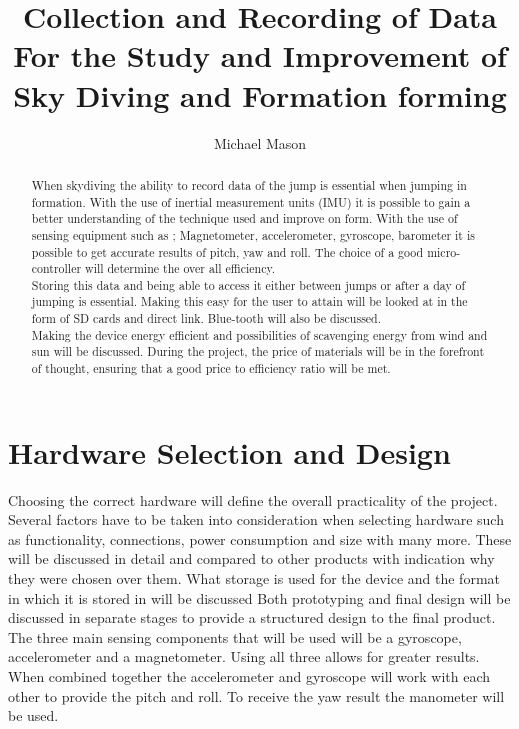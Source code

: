 \documentclass{report}
\begin{document}
\title{Collection and Recording of Data For the Study and Improvement of Sky Diving and Formation forming}
\author{Michael Mason}

\maketitle


\begin{abstract}
When skydiving the ability to record data of the jump is essential when jumping in formation. With the use of inertial measurement units (IMU) it is possible to gain a better understanding of the technique used and improve on form. With the use of sensing equipment such as ; Magnetometer, accelerometer, gyroscope, barometer it is possible to get accurate results of pitch, yaw and roll. The choice of a good micro-controller will determine the over all efficiency.\\
Storing this data and being able to access it either between jumps or after a day of jumping is essential. Making this easy for the user to attain will be looked at in the form of SD cards and direct link. Blue-tooth will also be discussed.\\
Making the device energy efficient and possibilities of scavenging energy from wind and sun will be discussed. During the project, the price of materials will be in the forefront of thought, ensuring that a good price to efficiency ratio will be met.

\end{abstract}

\tableofcontents



\chapter{Hardware Selection and Design}
Choosing the correct hardware will define the overall practicality of the project. Several factors have to be taken into consideration when selecting hardware such as functionality, connections, power consumption and size with many more. These will be discussed in detail and compared to other products with indication why they were chosen over them. What storage is used for the device and the format in which it is stored in will be discussed
Both prototyping and final design will be discussed in separate stages to provide a structured design to the final product.
The three main sensing components that will be used will be a gyroscope, accelerometer and a magnetometer. Using all three allows for greater results. When combined together the accelerometer and gyroscope will work with each other to provide the pitch and roll. To receive the yaw result the manometer will be used.
\end{document}
